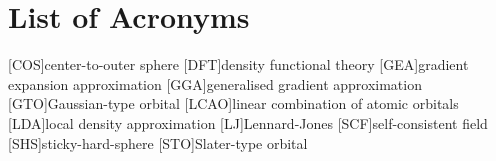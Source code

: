 
\chapter*{List of Acronyms}

\begin{acronym}[ABCDEFGHIJK]
    [COS]{center-to-outer sphere}
    [DFT]{density functional theory}
	[GEA]{gradient expansion approximation}
	[GGA]{generalised gradient approximation}
    [GTO]{Gaussian-type orbital}
    [LCAO]{linear combination of atomic orbitals}
    [LDA]{local density approximation}
    [LJ]{Lennard-Jones}
    [SCF]{self-consistent field}
    [SHS]{sticky-hard-sphere}
    [STO]{Slater-type orbital}
\end{acronym}
